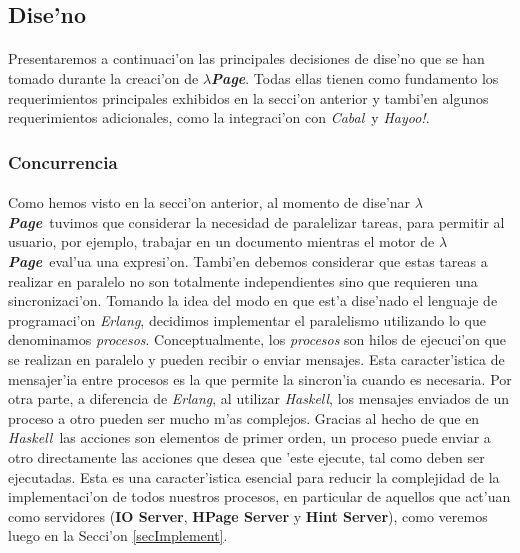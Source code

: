 \documentclass[a4paper]{article}
\newcommand{\haskell}{\textsl{Haskell}}
\newcommand{\hpage}{\textbf{\textsl{$\lambda$Page}}}
\newcommand{\cabal}{\textsl{Cabal}}
\begin{document}
\newpage
\subsection{Dise'no}
\begin{epigraphs}
\end{epigraphs}
\paragraph{}Presentaremos a continuaci'on las principales decisiones de dise'no que se han tomado durante la creaci'on de \hpage.  Todas ellas tienen como fundamento los requerimientos principales exhibidos en la secci'on anterior y tambi'en algunos requerimientos adicionales, como la integraci'on con \cabal\ y \textsl{Hayoo!}.
\subsubsection{Concurrencia}
\paragraph{}Como hemos visto en la secci'on anterior, al momento de dise'nar \hpage\ tuvimos que considerar la necesidad de paralelizar tareas, para permitir al usuario, por ejemplo, trabajar en un documento mientras el motor de \hpage\ eval'ua una expresi'on.  Tambi'en debemos considerar que estas tareas a realizar en paralelo no son totalmente independientes sino que requieren una sincronizaci'on.  Tomando la idea del modo en que est'a dise'nado el lenguaje de programaci'on \textsl{Erlang}, decidimos implementar el paralelismo utilizando lo que denominamos \textsl{procesos}.  Conceptualmente, los \textsl{procesos} son hilos de ejecuci'on que se realizan en paralelo y pueden recibir o enviar mensajes.   Esta caracter'istica de mensajer'ia entre procesos es la que permite la sincron'ia cuando es necesaria.  Por otra parte, a diferencia de \textsl{Erlang}, al utilizar \haskell, los mensajes enviados de un proceso a otro pueden ser mucho m'as complejos.  Gracias al hecho de que en \haskell\ las acciones son elementos de primer orden, un proceso puede enviar a otro directamente las acciones que desea que 'este ejecute, tal como deben ser ejecutadas.  Esta es una caracter'istica esencial para reducir la complejidad de la implementaci'on de todos nuestros procesos, en particular de aquellos que act'uan como servidores (\textbf{IO Server}, \textbf{HPage Server} y \textbf{Hint Server}), como veremos luego en la Secci'on \ref{secImplement}.
\end{document}
